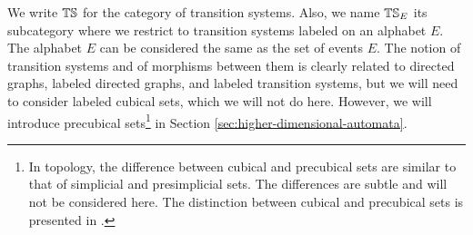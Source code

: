     
    We write $\mathbb{TS}$ for the category of transition systems. Also, we name $\mathbb{TS}_{E}$ its subcategory where we restrict to transition systems labeled on an alphabet $E$. The alphabet $E$ can be considered the same as the set of events $E$. The notion of transition systems and of morphisms between them is clearly related to directed graphs, labeled directed graphs, and labeled transition systems, but we will need to consider labeled cubical sets, which we will not do here. However, we will introduce precubical sets\footnote{In topology, the difference between cubical and precubical sets are similar to that of simplicial and presimplicial sets. The differences are subtle and will not be considered here. The distinction between cubical and precubical sets is presented in \cite{Goubault95PhDThesis}.} in Section \ref{sec:higher-dimensional-automata}.